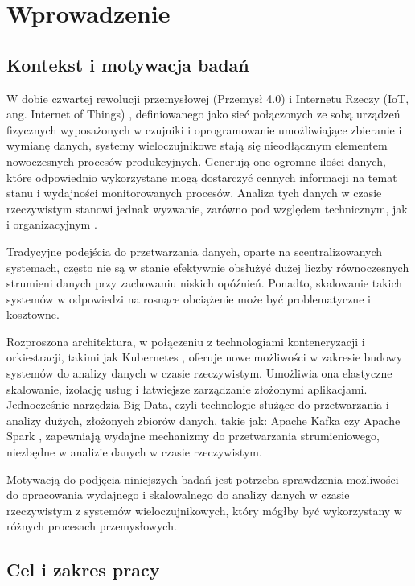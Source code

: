 \section{Wprowadzenie}
\label{sec:wprowadzenie}

\subsection{Kontekst i motywacja badań}
\label{subsec:kontekst}

W dobie czwartej rewolucji przemysłowej (Przemysł 4.0) \cite{przemysl40_iot_ogolnie} i Internetu Rzeczy (IoT, ang. Internet of Things) \cite{iot_definition_aws}, definiowanego jako sieć połączonych ze sobą urządzeń fizycznych wyposażonych w czujniki i oprogramowanie umożliwiające zbieranie i wymianę danych, systemy wieloczujnikowe stają się nieodłącznym 
elementem nowoczesnych procesów produkcyjnych. Generują one ogromne ilości danych, które odpowiednio wykorzystane mogą dostarczyć
cennych informacji na temat stanu i wydajności monitorowanych procesów. Analiza tych danych w czasie rzeczywistym stanowi jednak
wyzwanie, zarówno pod względem technicznym, jak i organizacyjnym \cite{realtime_challenges}.

Tradycyjne podejścia do przetwarzania danych, oparte na scentralizowanych systemach, często nie są w stanie efektywnie obsłużyć
dużej liczby równoczesnych strumieni danych przy zachowaniu niskich opóźnień. Ponadto, skalowanie takich systemów w odpowiedzi na rosnące
obciążenie może być problematyczne i kosztowne.

Rozproszona architektura, w połączeniu z technologiami konteneryzacji i orkiestracji, takimi jak Kubernetes \cite{kubernetes_benefits},
oferuje nowe możliwości w zakresie budowy systemów do analizy danych w czasie rzeczywistym. Umożliwia ona elastyczne skalowanie,
izolację usług i łatwiejsze zarządzanie złożonymi aplikacjami. Jednocześnie narzędzia Big Data, czyli technologie służące do przetwarzania i analizy dużych, złożonych zbiorów danych, takie jak: Apache Kafka czy Apache Spark \cite{kafka, spark_streaming}, zapewniają
wydajne mechanizmy do przetwarzania strumieniowego, niezbędne w analizie danych w czasie rzeczywistym.

Motywacją do podjęcia niniejszych badań jest potrzeba sprawdzenia możliwości do opracowania wydajnego i skalowalnego do
analizy danych w czasie rzeczywistym z systemów wieloczujnikowych, który mógłby być wykorzystany w różnych procesach przemysłowych.

\subsection{Cel i zakres pracy}
\label{subsec:cel}


